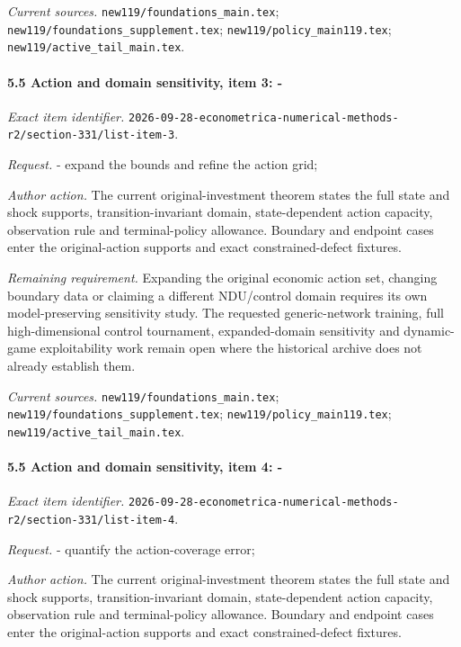 \par\emph{Current sources.} \nolinkurl{new119/foundations_main.tex}; \nolinkurl{new119/foundations_supplement.tex}; \nolinkurl{new119/policy_main119.tex}; \nolinkurl{new119/active_tail_main.tex}.

\paragraph{5.5 Action and domain sensitivity, item 3: -}

\emph{Exact item identifier.} \nolinkurl{2026-09-28-econometrica-numerical-methods-r2/section-331/list-item-3}.

\par\emph{Request.} - expand the bounds and refine the action grid;

\par\emph{Author action.} The current original-investment theorem states the full state and shock supports, transition-invariant domain, state-dependent action capacity, observation rule and terminal-policy allowance. Boundary and endpoint cases enter the original-action supports and exact constrained-defect fixtures.

\par\emph{Remaining requirement.} Expanding the original economic action set, changing boundary data or claiming a different NDU/\allowbreak{}control domain requires its own model-preserving sensitivity study. The requested generic-network training, full high-dimensional control tournament, expanded-domain sensitivity and dynamic-game exploitability work remain open where the historical archive does not already establish them.

\par\emph{Current sources.} \nolinkurl{new119/foundations_main.tex}; \nolinkurl{new119/foundations_supplement.tex}; \nolinkurl{new119/policy_main119.tex}; \nolinkurl{new119/active_tail_main.tex}.

\paragraph{5.5 Action and domain sensitivity, item 4: -}

\emph{Exact item identifier.} \nolinkurl{2026-09-28-econometrica-numerical-methods-r2/section-331/list-item-4}.

\par\emph{Request.} - quantify the action-coverage error;

\par\emph{Author action.} The current original-investment theorem states the full state and shock supports, transition-invariant domain, state-dependent action capacity, observation rule and terminal-policy allowance. Boundary and endpoint cases enter the original-action supports and exact constrained-defect fixtures.

